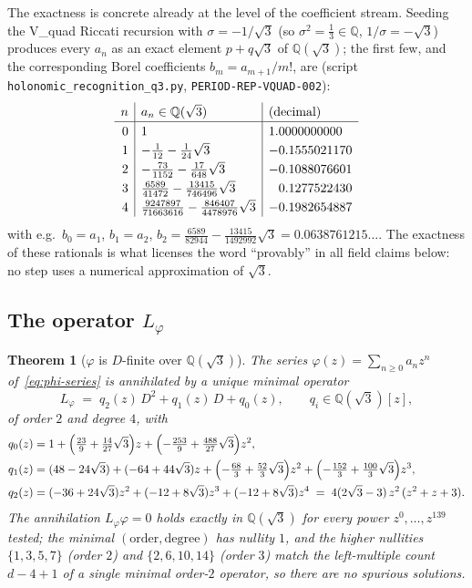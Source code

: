 \documentclass[11pt,reqno]{amsart}
\theoremstyle{plain}
\newtheorem{theorem}{Theorem}[section]
\theoremstyle{definition}
\newcommand{\Lphi}{L_{\varphi}}
\newcommand{\Qsqrt}{\mathbb{Q}(\sqrt3)}
\begin{document}
The exactness is concrete already at the level of the coefficient stream. Seeding the V\_quad
Riccati recursion with $\sigma=-1/\sqrt3$ (so $\sigma^2=\tfrac13\in\mathbb{Q}$,
$1/\sigma=-\sqrt3$) produces every $a_n$ as an exact element $p+q\sqrt3$ of $\Qsqrt$; the first
few, and the corresponding Borel coefficients $b_m=a_{m+1}/m!$, are
(script \texttt{holonomic\_recognition\_q3.py}, \texttt{PERIOD-REP-VQUAD-002}):
\begin{equation}\label{eq:coeffstream}
\renewcommand{\arraystretch}{1.25}
\begin{array}{r|l|l}
 n & a_n\in\Qsqrt & \text{(decimal)}\\\hline
 0 & 1 & 1.0000000000\\
 1 & -\tfrac{1}{12}-\tfrac{1}{24}\sqrt3 & -0.1555021170\\
 2 & -\tfrac{73}{1152}-\tfrac{17}{648}\sqrt3 & -0.1088076601\\
 3 & \tfrac{6589}{41472}-\tfrac{13415}{746496}\sqrt3 & \phantom{-}0.1277522430\\
 4 & \tfrac{9247897}{71663616}-\tfrac{846407}{4478976}\sqrt3 & -0.1982654887
\end{array}
\end{equation}
with e.g.\ $b_0=a_1$, $b_1=a_2$, $b_2=\tfrac{6589}{82944}-\tfrac{13415}{1492992}\sqrt3=
0.0638761215\ldots$. The exactness of these rationals is what licenses the word ``provably'' in
all field claims below: no step uses a numerical approximation of $\sqrt3$.

\subsection{The operator \texorpdfstring{$\Lphi$}{Lphi}}
\begin{theorem}[$\varphi$ is $D$-finite over $\Qsqrt$]\label{thm:Lphi}
The series $\varphi(z)=\sum_{n\ge0}a_nz^n$ of~\eqref{eq:phi-series} is annihilated by a unique
minimal operator
\[
  \Lphi \;=\; q_2(z)\,D^2 + q_1(z)\,D + q_0(z),\qquad q_i\in\Qsqrt[z],
\]
of order $2$ and degree $4$, with
\begin{align*}
  q_0(z)&=1+\Bigl(\tfrac{23}{9}+\tfrac{14}{27}\sqrt3\Bigr)z
              +\Bigl(-\tfrac{253}{9}+\tfrac{488}{27}\sqrt3\Bigr)z^2,\\
  q_1(z)&=(48-24\sqrt3)+(-64+44\sqrt3)z+\Bigl(-\tfrac{68}{3}+\tfrac{52}{3}\sqrt3\Bigr)z^2
              +\Bigl(-\tfrac{152}{3}+\tfrac{100}{3}\sqrt3\Bigr)z^3,\\
  q_2(z)&=(-36+24\sqrt3)z^2+(-12+8\sqrt3)z^3+(-12+8\sqrt3)z^4
           \;=\;4(2\sqrt3-3)\,z^2\,(z^2+z+3).
\end{align*}
The annihilation $\Lphi\varphi=0$ holds exactly in $\Qsqrt$ for every power $z^0,\dots,z^{139}$
tested; the minimal $(\text{order},\text{degree})$ has nullity $1$, and the higher nullities
$\{1,3,5,7\}$ (order $2$) and $\{2,6,10,14\}$ (order $3$) match the left-multiple count
$d-4+1$ of a single minimal order-$2$ operator, so there are no spurious solutions.
\end{theorem}
\end{document}
